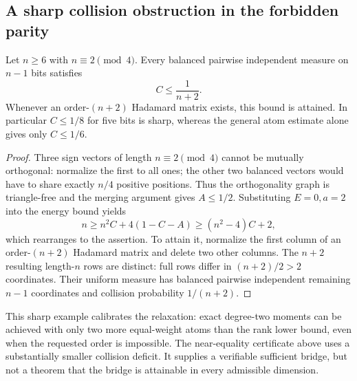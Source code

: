 \subsection{A sharp collision obstruction in the forbidden parity}
\begin{proposition}
\label{s10:prop:discrete-parity-collision}
Let $n\ge6$ with $n\equiv2\pmod4$. Every balanced pairwise independent
measure on $n-1$ bits satisfies
\[
 C\le\frac1{n+2}.
\]
Whenever an order-$(n+2)$ Hadamard matrix exists, this bound is attained.
In particular $C\le1/8$ for five bits is sharp, whereas the general
atom estimate alone gives only $C\le1/6$.
\end{proposition}
\begin{proof}
Three sign vectors of length $n\equiv2\pmod4$ cannot be mutually
orthogonal: normalize the first to all ones; the other two balanced
vectors would have to share exactly $n/4$ positive positions.
Thus the orthogonality graph is triangle-free and the merging argument
gives $A\le1/2$. Substituting $E=0,a=2$ into the energy bound yields
\[
 n\ge n^2C+4(1-C-A)\ge(n^2-4)C+2,
\]
which rearranges to the assertion. To attain it, normalize the first
column of an order-$(n+2)$ Hadamard matrix and delete two other columns.
The $n+2$ resulting length-$n$ rows are distinct: full rows differ in
$(n+2)/2>2$ coordinates. Their uniform measure has balanced pairwise
independent remaining $n-1$ coordinates and collision probability
$1/(n+2)$.
\end{proof}
This sharp example calibrates the relaxation: exact degree-two moments
can be achieved with only two more equal-weight atoms than the
rank lower bound, even when the requested order is impossible. The
near-equality certificate above uses a substantially smaller collision
deficit. It supplies a verifiable sufficient bridge, but not a theorem
that the bridge is attainable in every admissible dimension.


